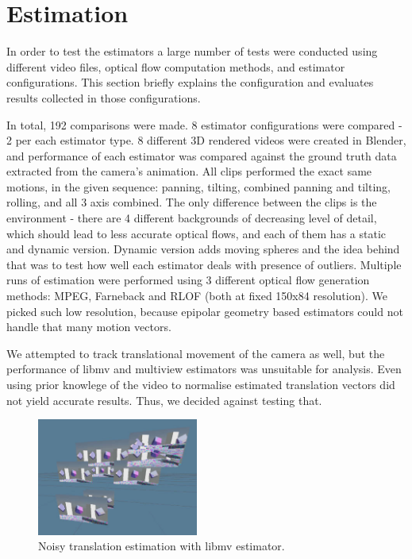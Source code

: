 \documentclass[11pt,english]{report}
\begin{document}
\section{Estimation}

In order to test the estimators a large number of tests were conducted using different video files, optical flow computation methods, and estimator configurations. This section briefly explains the configuration and evaluates results collected in those configurations.

In total, 192 comparisons were made. 8 estimator configurations were compared - 2 per each estimator type. 8 different 3D rendered videos were created in Blender, and performance of each estimator was compared against the ground truth data extracted from the camera's animation. All clips performed the exact same motions, in the given sequence: panning, tilting, combined panning and tilting, rolling, and all 3 axis combined. The only difference between the clips is the environment - there are 4 different backgrounds of decreasing level of detail, which should lead to less accurate optical flows, and each of them has a static and dynamic version. Dynamic version adds moving spheres and the idea behind that was to test how well each estimator deals with presence of outliers. Multiple runs of estimation were performed using 3 different optical flow generation methods: MPEG, Farneback and RLOF (both at fixed 150x84 resolution). We picked such low resolution, because epipolar geometry based estimators could not handle that many motion vectors.

We attempted to track translational movement of the camera as well, but the performance of libmv and multiview estimators was unsuitable for analysis. Even using prior knowlege of the video to normalise estimated translation vectors did not yield accurate results. Thus, we decided against testing that.

\begin{figure}[!ht]
	\centering
	\includegraphics[width=150pt]{docs/report/translation.jpg}
	\caption{\centering Noisy translation estimation with libmv estimator.}
\end{figure}
\end{document}
